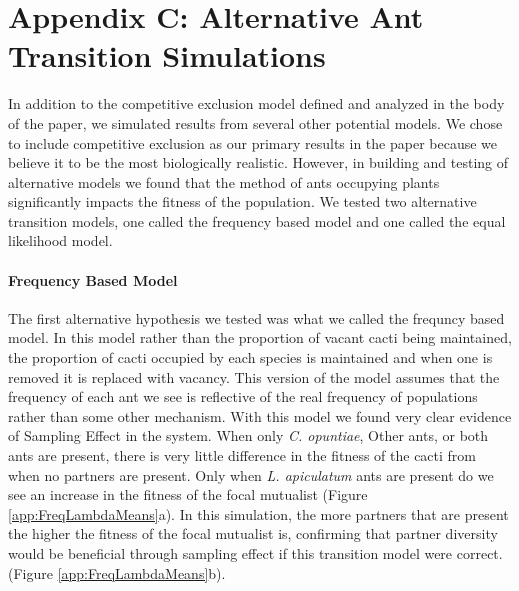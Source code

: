 \documentclass[11pt]{article}
\begin{document}
\section*{Appendix C: Alternative Ant Transition Simulations}\label{appendix:C}
In addition to the competitive exclusion model defined and analyzed in the body of the paper, we simulated results from several other potential models. 
We chose to include competitive exclusion as our primary results in the paper because we believe it to be the most biologically realistic.
However, in building and testing of alternative models we found that the method of ants occupying plants significantly impacts the fitness of the population. 
We tested two alternative transition models, one called the frequency based model and one called the equal likelihood model. 

\paragraph{Frequency Based Model}
The first alternative hypothesis we tested was what we called the frequncy based model.
In this model rather than the proportion of vacant cacti being maintained, the proportion of cacti occupied by each species is maintained and when one is removed it is replaced with vacancy.
This version of the model assumes that the frequency of each ant we see is reflective of the real frequency of populations rather than some other mechanism.
With this model we found very clear evidence of Sampling Effect in the system. 
When only  \textit{C. opuntiae}, Other ants, or both ants are present, there is very little difference in the fitness of the cacti from when no partners are present. 
Only when \textit{L. apiculatum} ants are present do we see an increase in the fitness of the focal mutualist (Figure \ref{app:FreqLambdaMeans}a).
In this simulation, the more partners that are present the higher the fitness of the focal mutualist is, confirming that partner diversity would be beneficial through sampling effect if this transition model were correct.  (Figure \ref{app:FreqLambdaMeans}b).

\renewcommand{\thefigure}{A\arabic{figure}}
\end{document}
